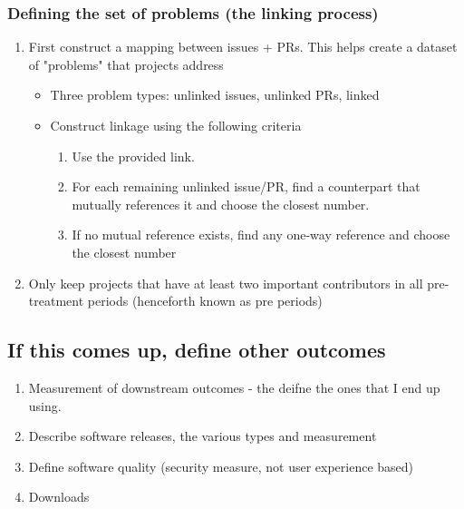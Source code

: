 \documentclass[12pt,notitlepage]{article}
\begin{document}
\subsubsection{Defining the set of problems (the linking process)}
\begin{enumerate}
    \item First construct a mapping between issues + PRs. This helps create a dataset of "problems" that projects address
    \begin{itemize}
        \item Three problem types: unlinked issues, unlinked PRs, linked
        \item Construct linkage using the following criteria
        \begin{enumerate}
          \item Use the provided link.
          \item For each remaining unlinked issue/PR, find a counterpart that mutually references it and choose the closest number.
          \item If no mutual reference exists, find any one-way reference and choose the closest number
        \end{enumerate}
    \end{itemize}
    \item Only keep projects that have at least two important contributors in all pre-treatment periods (henceforth known as pre periods)
\end{enumerate}
\subsection{If this comes up, define other outcomes}


\begin{enumerate}
    \item Measurement of downstream outcomes - the deifne the ones that I end up using. 
    \item Describe software releases, the various types and measurement
    \item Define software quality (security measure, not user experience based)
    \item Downloads
\end{enumerate}
\end{document}
